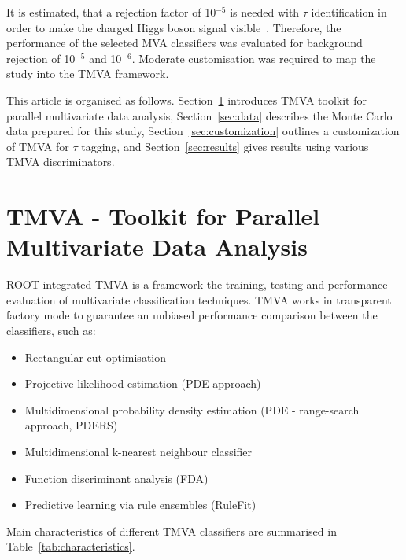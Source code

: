 \documentclass[a4paper]{jpconf}
\begin{document}
It is estimated, that a rejection factor of 10$^{-5}$ is needed with
$\tau$ identification in order to make the charged Higgs boson signal
visible~\cite{ptdrII}. Therefore, the performance of the selected MVA
classifiers was evaluated for background rejection of 10$^{-5}$ and
10$^{-6}$. Moderate customisation was required to map the study into
the TMVA framework.

This article is organised as follows. Section~\ref{sec:tmva} introduces
TMVA toolkit for parallel multivariate data analysis,
Section~\ref{sec:data} describes the Monte Carlo data prepared for this study,
Section~\ref{sec:customization} outlines a customization of TMVA for $\tau$ tagging,
and Section~\ref{sec:results} gives results using various TMVA discriminators.

\section{TMVA - Toolkit for Parallel Multivariate Data Analysis}\label{sec:tmva}

ROOT-integrated TMVA is a framework the training, testing and performance evaluation
of multivariate classification techniques.
TMVA works in transparent factory mode 
to guarantee an unbiased performance comparison between the classifiers, such as:

\begin{itemize}
\item Rectangular cut optimisation
\item Projective likelihood estimation (PDE approach)
\item Multidimensional probability density estimation (PDE - range-search approach, PDERS)
\item Multidimensional k-nearest neighbour classifier
\item Function discriminant analysis (FDA)
\item Predictive learning via rule ensembles (RuleFit)
\end{itemize}
 
Main characteristics of different TMVA classifiers are summarised in Table~\ref{tab:characteristics}.
\end{document}
